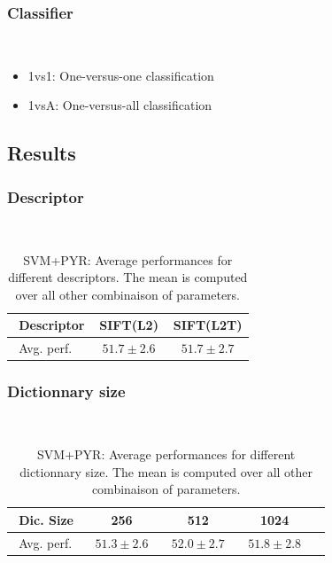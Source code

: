 \documentclass[10pt,a4paper]{llncs}
\begin{document}
\subsubsection{Classifier}$~$\\
\begin{itemize}
\item 1vs1: One-versus-one classification
\item 1vsA: One-versus-all classification
\end{itemize}

\subsection{Results}

\subsubsection{Descriptor}$~$\\

\begin{table}[H]
\centering
\caption{SVM+PYR: Average performances for different descriptors. The mean is computed over all other combinaison of parameters.}
\label{table:SVM_PYR:Descriptor}
\begin{tabular}{|l|c|c|}
\hline
$~~$Descriptor & SIFT(L2) & SIFT(L2T) \\ \hline
$~~$Avg. perf.$~~$ & $~~\mathbf{51.7\pm2.6}~~$ & $~~51.7\pm2.7~~$ \\ \hline
\end{tabular}
\end{table}

\subsubsection{Dictionnary size}$~$\\

\begin{table}[H]
\centering
\caption{SVM+PYR: Average performances for different dictionnary size. The mean is computed over all other combinaison of parameters.}
\label{table:SVM_PYR:DicSize}
\begin{tabular}{|l|c|c|c|c|}
\hline
$~~$Dic. Size & 256 & 512 & 1024 \\ \hline
$~~$Avg. perf.$~~$ & $~~51.3\pm2.6~~$ & $~~\mathbf{52.0\pm2.7}~~$ & $~~51.8\pm2.8~~$ \\ \hline
\end{tabular}
\end{table}
\end{document}
